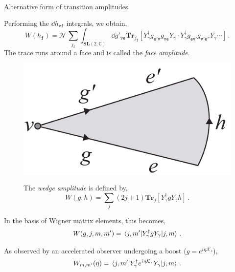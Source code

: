 \documentclass[12pt,titlepage]{article}
\begin{document}
\begin{frame}{Alternative form of transition amplitudes}
    \begin{list}{\,}{\leftmargin=1em \itemindent=0em}
        \item<1-> Performing the $\dd{h_\mathtt{vf}}$ integrals, we obtain,
        \begin{equation}
            W(h_\mathtt{f})=\mathcal{N}\,\sum_{j_\mathtt{f}}\int_{{\mathbf{SL}(2,\mathbb{C})}}\dd{g'_\mathtt{ve}}\mathbf{Tr}_{j_\mathtt{f}}[Y_\gamma^\dagger g_\mathtt{e'v}g_\mathtt{ve}Y_\gamma\cdot Y_\gamma^\dagger g_\mathtt{ev'}g_\mathtt{v'e''}Y_\gamma\cdots]\,.
        \end{equation}
        The trace runs around a face and is called the \textit{face amplitude}.
        \item<2-> \noindent\FloatBarrier
        \begin{figure}[!ht]
            \begin{minipage}{0.25\linewidth}
                \includegraphics[width=\linewidth]{4.13}
            \end{minipage}
            \begin{minipage}{0.75\linewidth}\centering
                The \textit{wedge amplitude} is defined by,
                \begin{equation}
                    W(g,h)=\sum_j(2j+1)\mathbf{Tr}_{j}[Y_\gamma^\dagger g Y_\gamma h]\,.
                \end{equation}
            \end{minipage}
        \end{figure}\FloatBarrier
        \item<3-> In the basis of Wigner matrix elements, this becomes,
        \begin{equation}
            W(g,j,m,m')=\mel{j,m'}{Y_\gamma^\dagger g Y_\gamma}{j,m}\,.
        \end{equation}
        \item<4-> As observed by an accelerated observer undergoing a boost ($g=e^{i\eta\mathcal{K}_z}$),
        \begin{equation}
            W_{m,m'}(\eta)=\mel{j,m'}{Y_\gamma^\dagger e^{i\eta\mathcal{K}_z} Y_\gamma}{j,m}\,.
        \end{equation}
    \end{list}
\end{frame}
\end{document}
